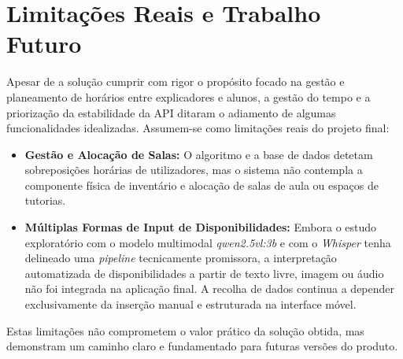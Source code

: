 \section{Limitações Reais e Trabalho Futuro}

Apesar de a solução cumprir com rigor o propósito focado na gestão e planeamento de horários entre explicadores e alunos, a gestão do tempo e a priorização da estabilidade da API ditaram o adiamento de algumas funcionalidades idealizadas. Assumem-se como limitações reais do projeto final:

\begin{itemize}
    \item \textbf{Gestão e Alocação de Salas:} O algoritmo e a base de dados detetam sobreposições horárias de utilizadores, mas o sistema não contempla a componente física de inventário e alocação de salas de aula ou espaços de tutorias.
    \item \textbf{Múltiplas Formas de Input de Disponibilidades:} Embora o estudo exploratório com o modelo multimodal \textit{qwen2.5vl:3b} e com o \textit{Whisper} tenha delineado uma \textit{pipeline} tecnicamente promissora, a interpretação automatizada de disponibilidades a partir de texto livre, imagem ou áudio não foi integrada na aplicação final. A recolha de dados continua a depender exclusivamente da inserção manual e estruturada na interface móvel.
\end{itemize}

Estas limitações não comprometem o valor prático da solução obtida, mas demonstram um caminho claro e fundamentado para futuras versões do produto.
